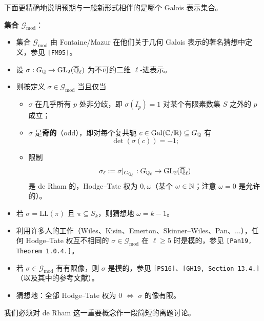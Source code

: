 下面更精确地说明预期与一般新形式相伴的是哪个 Galois 表示集合。

\textbf{集合 $\mathcal G_{\mathrm{mod}}$}：
\begin{itemize}
\item 集合 $\mathcal G_{\mathrm{mod}}$ 由 Fontaine/Mazur 在他们关于几何 Galois 表示的著名猜想中定义，参见 \texttt{[FM95]}。
\item 设 $\sigma:G_{\mathbb{Q}}\to\operatorname{GL}_2(\overline{\mathbb{Q}}_\ell)$ 为不可约二维 $\ell$-进表示。
\item 则按定义 $\sigma\in\mathcal G_{\mathrm{mod}}$ 当且仅当
\begin{itemize}
\item $\sigma$ 在几乎所有 $p$ 处非分歧，即 $\sigma(I_p)=1$ 对某个有限素数集 $S$ 之外的 $p$ 成立；
\item $\sigma$ 是\textbf{奇的}（odd），即对每个复共轭 $c\in\operatorname{Gal}(\mathbb{C}/\mathbb{R})\subseteq G_{\mathbb{Q}}$ 有
\[
\det(\sigma(c))=-1;
\]
\item 限制
\[
\sigma_\ell:=\sigma|_{G_{\mathbb{Q}_\ell}}:G_{\mathbb{Q}_\ell}\to\operatorname{GL}_2(\overline{\mathbb{Q}}_\ell)
\]
是 de Rham 的，Hodge--Tate 权为 $0,\omega$（某个 $\omega\in\mathbb{N}$；注意 $\omega=0$ 是允许的）。
\end{itemize}
\item 若 $\sigma=\mathrm{LL}(\pi)$ 且 $\pi\subseteq S_k$，则猜想地 $\omega=k-1$。
\item 利用许多人的工作（Wiles、Kisin、Emerton、Skinner--Wiles、Pan、$\dots$），任何 Hodge--Tate 权互不相同的 $\sigma\in\mathcal G_{\mathrm{mod}}$ 在 $\ell\ge5$ 时是模的，参见 \texttt{[Pan19, Theorem 1.0.4.]}。
\item 若 $\sigma\in\mathcal G_{\mathrm{mod}}$ 有有限像，则 $\sigma$ 是模的，参见 \texttt{[PS16]}、\texttt{[GH19, Section 13.4.]}（以及其中的参考文献）。
\item 猜想地：全部 Hodge--Tate 权为 $0$ $\Leftrightarrow$ $\sigma$ 的像有限。
\end{itemize}

我们必须对 de Rham 这一重要概念作一段简短的离题讨论。

